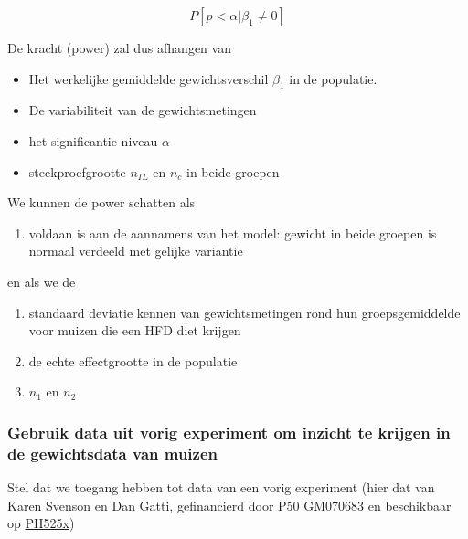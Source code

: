 \documentclass[
]{article}
\providecommand{\tightlist}{%
  \setlength{\itemsep}{0pt}\setlength{\parskip}{0pt}}
\begin{document}
\[
P[p < \alpha \vert \beta_1 \neq 0]
\]

De kracht (power) zal dus afhangen van

\begin{itemize}
\tightlist
\item
  Het werkelijke gemiddelde gewichtsverschil \(\beta_1\) in de
  populatie.
\item
  De variabiliteit van de gewichtsmetingen
\item
  het significantie-niveau \(\alpha\)
\item
  steekproefgrootte \(n_{IL}\) en \(n_c\) in beide groepen
\end{itemize}

We kunnen de power schatten als

\begin{enumerate}
\def\labelenumi{\arabic{enumi}.}
\tightlist
\item
  voldaan is aan de aannamens van het model: gewicht in beide groepen is
  normaal verdeeld met gelijke variantie
\end{enumerate}

en als we de

\begin{enumerate}
\def\labelenumi{\arabic{enumi}.}
\setcounter{enumi}{1}
\item
  standaard deviatie kennen van gewichtsmetingen rond hun
  groepsgemiddelde voor muizen die een HFD diet krijgen
\item
  de echte effectgrootte in de populatie
\item
  \(n_1\) en \(n_2\)
\end{enumerate}

\hypertarget{gebruik-data-uit-vorig-experiment-om-inzicht-te-krijgen-in-de-gewichtsdata-van-muizen}{%
\subsubsection{Gebruik data uit vorig experiment om inzicht te krijgen
in de gewichtsdata van
muizen}\label{gebruik-data-uit-vorig-experiment-om-inzicht-te-krijgen-in-de-gewichtsdata-van-muizen}}

Stel dat we toegang hebben tot data van een vorig experiment (hier dat
van Karen Svenson en Dan Gatti, gefinancierd door P50 GM070683 en
beschikbaar op
\href{http://genomicsclass.github.io/book/pages/random_variables.html}{PH525x})
\end{document}
